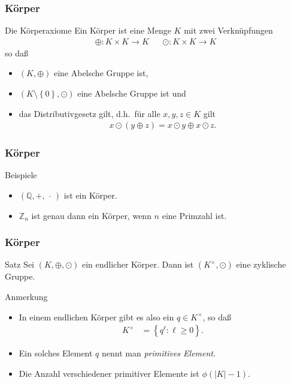 \documentclass{beamer}
\renewcommand{\emph}[1]{{\textcolor{solarizedRed}{\itshape #1}}}
\newcommand\ZZ{\mathbb Z}
\newcommand\QQ{\mathbb Q}
\newcommand\cbc[1]{\left\{{#1}\right\}}
\renewcommand{\oe}{\"o}
\newcommand{\ue}{\"u}
\renewcommand{\otimes}{\odot}
\begin{document}
\begin{frame}\frametitle{K\oe rper}
	\begin{block}{Die K\oe rperaxiome}
		Ein K\oe rper ist eine Menge $K$ mit zwei Verkn\ue pfungen
		\begin{align*}
			\oplus:K\times K\to K&&\otimes:K\times K\to K
		\end{align*}
		so da\ss\ 
	\begin{itemize}
		\item $(K,\oplus)$ eine Abelsche Gruppe ist,
		\item $(K\setminus\cbc 0,\otimes)$ eine Abelsche Gruppe ist und
		\item das Distributivgesetz gilt, d.h.\ f\ue r alle $x,y,z\in K$ gilt
			\begin{align*}
				x\otimes(y\oplus z)=x\otimes y\oplus x\otimes z.
			\end{align*}
	\end{itemize}
	\end{block}
\end{frame}

\begin{frame}\frametitle{K\oe rper}
	\begin{block}{Beispiele}
		\begin{itemize}
			\item $(\QQ,+,\,\cdot\,)$ ist ein K\oe rper.
			\item $\ZZ_n$ ist genau dann ein K\oe rper, wenn $n$ eine Primzahl ist.
		\end{itemize}
	\end{block}
\end{frame}

\begin{frame}\frametitle{K\oe rper}
	\begin{block}{Satz}
		Sei $(K,\oplus,\otimes)$ ein endlicher K\oe rper.
		Dann ist $(K^\times,\otimes)$ eine zyklische Gruppe.
	\end{block}
	\begin{block}{Anmerkung}
		\begin{itemize}
			\item In einem endlichen K\oe rper gibt es also ein $q\in K^\times$, so da\ss\
				\begin{align*}
					K^\times&=\cbc{q^\ell:\ell\geq0}.
				\end{align*}
			\item Ein solches Element $q$ nennt man \emph{primitives Element}.
			\item Die Anzahl verschiedener primitiver Elemente ist $\phi(|K|-1)$.
		\end{itemize}
	\end{block}
\end{frame}
\end{document}
